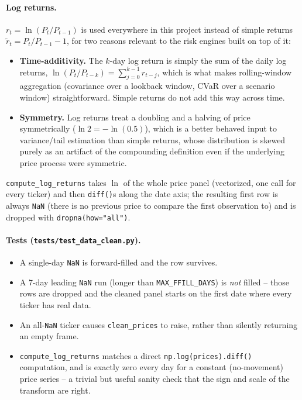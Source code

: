 \documentclass[11pt]{article}
\begin{document}
\paragraph{Log returns.} $r_t = \ln(P_t / P_{t-1})$ is used everywhere in
this project instead of simple returns
$\tilde r_t = P_t/P_{t-1} - 1$, for two reasons relevant to the risk
engines built on top of it:
\begin{itemize}
    \item \textbf{Time-additivity.} The $k$-day log return is simply the
    sum of the daily log returns,
    $\ln(P_t/P_{t-k}) = \sum_{j=0}^{k-1} r_{t-j}$, which is what makes
    rolling-window aggregation (covariance over a lookback window, CVaR
    over a scenario window) straightforward. Simple returns do not add
    this way across time.
    \item \textbf{Symmetry.} Log returns treat a doubling and a halving
    of price symmetrically ($\ln 2 = -\ln(0.5)$), which is a better
    behaved input to variance/tail estimation than simple returns, whose
    distribution is skewed purely as an artifact of the compounding
    definition even if the underlying price process were symmetric.
\end{itemize}
\texttt{compute\_log\_returns} takes $\ln$ of the whole price panel
(vectorized, one call for every ticker) and then \texttt{diff()}s along
the date axis; the resulting first row is always \texttt{NaN} (there is
no previous price to compare the first observation to) and is dropped
with \texttt{dropna(how="all")}.

\paragraph{Tests (\texttt{tests/test\_data\_clean.py}).}
\begin{itemize}
    \item A single-day \texttt{NaN} is forward-filled and the row
    survives.
    \item A 7-day leading \texttt{NaN} run (longer than
    \texttt{MAX\_FFILL\_DAYS}) is \emph{not} filled -- those rows are
    dropped and the cleaned panel starts on the first date where every
    ticker has real data.
    \item An all-\texttt{NaN} ticker causes \texttt{clean\_prices} to
    raise, rather than silently returning an empty frame.
    \item \texttt{compute\_log\_returns} matches a direct
    \texttt{np.log(prices).diff()} computation, and is exactly zero every
    day for a constant (no-movement) price series -- a trivial but
    useful sanity check that the sign and scale of the transform are
    right.
\end{itemize}
\end{document}
